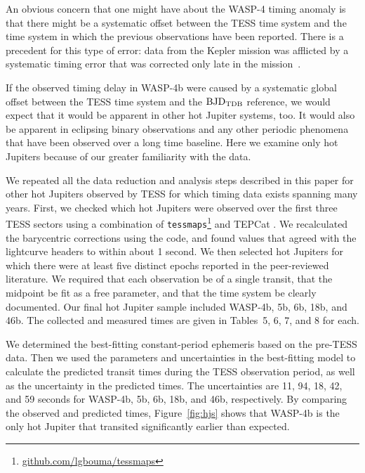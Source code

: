 \documentclass[12pt,twocolumn,tighten]{aastex62}
\begin{document}
{An obvious concern that one might have about the WASP-4
timing anomaly is that there might be a systematic offset between the
TESS time system and the time system in which the previous
observations have been reported.  There is a precedent for this type
of error: data from the Kepler mission was afflicted by a systematic
timing error that was corrected only late in the
mission~\citep[][Section 3.4]{kepler_DR19_2013}.

If the observed timing delay in WASP-4b were caused by a systematic
global offset between the TESS time system and the ${\rm BJD}_{\rm
TDB}$ reference, we would expect that it would be apparent in other
hot Jupiter systems, too. It would also be apparent in eclipsing
binary observations and any other periodic phenomena that have been
observed over a long time baseline. Here we examine only hot Jupiters
because of our greater familiarity with the data.

We repeated all the data reduction and analysis steps described in
this paper for other hot Jupiters observed by TESS for which timing
data exists spanning many years.  First, we checked which hot Jupiters
were observed over the first three TESS sectors using a combination of
\texttt{tessmaps}\footnote{\url{github.com/lgbouma/tessmaps}} and
TEPCat \citep{southworth_homogeneous_2011}.  We recalculated the
barycentric corrections using the \citet{eastman_achieving_2010} code,
and found values that agreed with the lightcurve headers to within
about 1 second.  We then selected hot Jupiters for which there were at
least five distinct epochs reported in the peer-reviewed literature.
We required that each observation be of a single transit, that the
midpoint be fit as a free parameter, and that the time system be
clearly documented.  Our final hot Jupiter sample included WASP-4b,
5b, 6b, 18b, and 46b.  The collected and measured times are given in
Tables~5, 6, 7, and 8 for each.

We determined the best-fitting constant-period ephemeris based on the
pre-TESS data. Then we used the parameters and uncertainties in the
best-fitting model to calculate the predicted transit times during
the TESS observation period, as well as the uncertainty in the
predicted times.  The uncertainties are 11, 94, 18, 42, and 59 seconds
for WASP-4b, 5b, 6b, 18b, and 46b, respectively.  By comparing the
observed and predicted times, Figure~\ref{fig:hjs} shows that WASP-4b
is the only hot Jupiter that transited significantly earlier than
expected.

}
\end{document}
